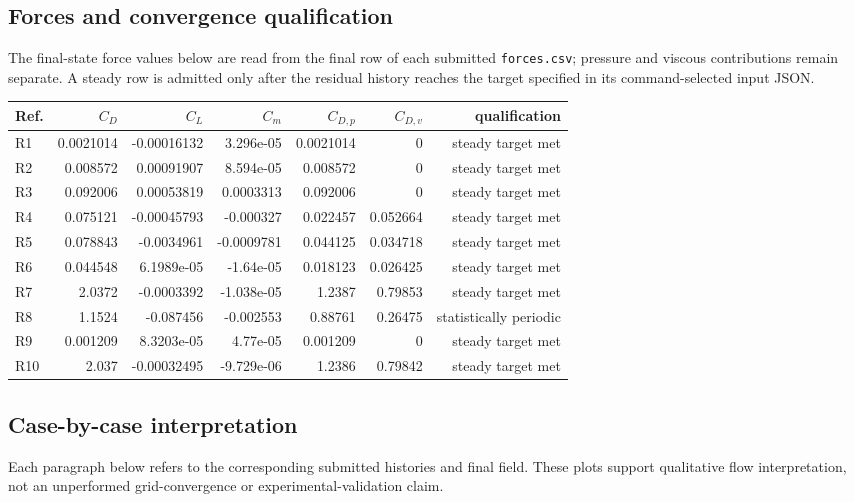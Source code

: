 \subsection{Forces and convergence qualification}
The final-state force values below are read from the final row of each submitted \texttt{forces.csv}; pressure and viscous contributions remain separate. A steady row is admitted only after the residual history reaches the target specified in its command-selected input JSON.
\begin{center}\small
\begin{tabular}{lrrrrrr}
\toprule Ref. & $C_D$ & $C_L$ & $C_m$ & $C_{D,p}$ & $C_{D,v}$ & qualification\\
\midrule
R1 & 0.0021014 & -0.00016132 & 3.296e-05 & 0.0021014 & 0 & steady target met\\
R2 & 0.008572 & 0.00091907 & 8.594e-05 & 0.008572 & 0 & steady target met\\
R3 & 0.092006 & 0.00053819 & 0.0003313 & 0.092006 & 0 & steady target met\\
R4 & 0.075121 & -0.00045793 & -0.000327 & 0.022457 & 0.052664 & steady target met\\
R5 & 0.078843 & -0.0034961 & -0.0009781 & 0.044125 & 0.034718 & steady target met\\
R6 & 0.044548 & 6.1989e-05 & -1.64e-05 & 0.018123 & 0.026425 & steady target met\\
R7 & 2.0372 & -0.0003392 & -1.038e-05 & 1.2387 & 0.79853 & steady target met\\
R8 & 1.1524 & -0.087456 & -0.002553 & 0.88761 & 0.26475 & statistically periodic\\
R9 & 0.001209 & 8.3203e-05 & 4.77e-05 & 0.001209 & 0 & steady target met\\
R10 & 2.037 & -0.00032495 & -9.729e-06 & 1.2386 & 0.79842 & steady target met\\
\bottomrule
\end{tabular}
\label{tab:forces}
\end{center}
\subsection{Case-by-case interpretation}
Each paragraph below refers to the corresponding submitted histories and final field. These plots support qualitative flow interpretation, not an unperformed grid-convergence or experimental-validation claim.
